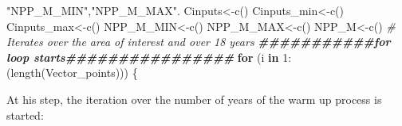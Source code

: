 \documentclass[
  10pt,
  b5paper,
]{book}
\newenvironment{Shaded}{\begin{snugshade}}{\end{snugshade}}
\newcommand{\CommentTok}[1]{\textcolor[rgb]{0.56,0.35,0.01}{\textit{#1}}}
\newcommand{\ControlFlowTok}[1]{\textcolor[rgb]{0.13,0.29,0.53}{\textbf{#1}}}
\newcommand{\DecValTok}[1]{\textcolor[rgb]{0.00,0.00,0.81}{#1}}
\newcommand{\DocumentationTok}[1]{\textcolor[rgb]{0.56,0.35,0.01}{\textbf{\textit{#1}}}}
\newcommand{\FunctionTok}[1]{\textcolor[rgb]{0.00,0.00,0.00}{#1}}
\newcommand{\NormalTok}[1]{#1}
\newcommand{\OtherTok}[1]{\textcolor[rgb]{0.56,0.35,0.01}{#1}}
\newcommand{\SpecialCharTok}[1]{\textcolor[rgb]{0.00,0.00,0.00}{#1}}
\newcommand{\StringTok}[1]{\textcolor[rgb]{0.31,0.60,0.02}{#1}}
\begin{document}
\begin{Shaded}
\begin{Highlighting}[]
\StringTok{"NPP\_M\_MIN"}\NormalTok{,}\StringTok{"NPP\_M\_MAX"}\NormalTok{.}
\NormalTok{Cinputs}\OtherTok{\textless{}{-}}\FunctionTok{c}\NormalTok{()}
\NormalTok{Cinputs\_min}\OtherTok{\textless{}{-}}\FunctionTok{c}\NormalTok{()}
\NormalTok{Cinputs\_max}\OtherTok{\textless{}{-}}\FunctionTok{c}\NormalTok{()}
\NormalTok{NPP\_M\_MIN}\OtherTok{\textless{}{-}}\FunctionTok{c}\NormalTok{()}
\NormalTok{NPP\_M\_MAX}\OtherTok{\textless{}{-}}\FunctionTok{c}\NormalTok{()}
\NormalTok{NPP\_M}\OtherTok{\textless{}{-}}\FunctionTok{c}\NormalTok{()}
\CommentTok{\# Iterates over the area of interest and over 18 years }
\DocumentationTok{\#\#\#\#\#\#\#\#\#\#\#for loop starts\#\#\#\#\#\#\#\#\#\#\#\#\#\#\#\#}
\ControlFlowTok{for}\NormalTok{ (i }\ControlFlowTok{in} \DecValTok{1}\SpecialCharTok{:}\NormalTok{(}\FunctionTok{length}\NormalTok{(Vector\_points))) \{}
\end{Highlighting}
\end{Shaded}

At his step, the iteration over the number of years of the warm up process is started:
\end{document}
